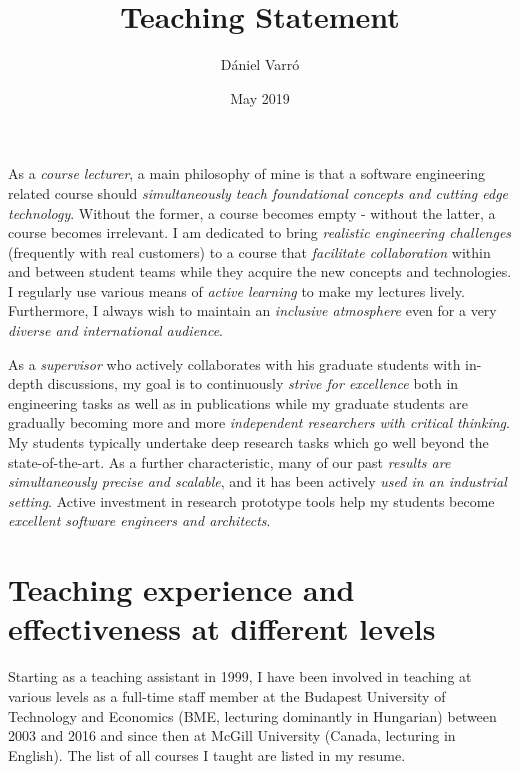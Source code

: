 \documentclass[a4paper,11pt]{article}
\title{Teaching Statement}
\author{D\'aniel Varr\'o}
\date{May 2019}
\begin{document}
\maketitle
\setcounter{page}{17}

\vspace{12pt}

\begin{tcolorbox}[title=Teaching Philosophy]
As a \emph{course lecturer}, a main philosophy of mine is that a software engineering related course should \emph{simultaneously teach foundational concepts and cutting edge technology}. Without the former, a course becomes empty - without the latter, a course becomes irrelevant. I am dedicated to bring \emph{realistic engineering challenges} (frequently with real customers) to a course that \emph{facilitate collaboration} within and between student teams while they acquire the new concepts and technologies. I regularly use various  means of \emph{active learning} to make my lectures lively. Furthermore, I always wish to maintain an \emph{inclusive atmosphere} even for a very \emph{diverse and international audience}. 
\vspace{3pt}

As a \emph{supervisor} who actively collaborates with his graduate students with in-depth discussions, my goal is to continuously \emph{strive for excellence} both in engineering tasks as well as in publications while my graduate students are gradually becoming more and more \emph{independent researchers with critical thinking}.  My students typically undertake deep research tasks which go well beyond the state-of-the-art. As a further characteristic, many of our past \emph{results are simultaneously precise and scalable}, and it has been actively \emph{used in an industrial setting}. Active investment in research prototype tools help my students become \emph{excellent software engineers and architects}.
\end{tcolorbox}


\section{Teaching experience and effectiveness at different levels}
Starting as a teaching assistant in 1999, I have been involved in teaching at various levels as a full-time staff member at the Budapest University of Technology and Economics (BME, lecturing dominantly in Hungarian) between 2003 and 2016 and since then at McGill University (Canada, lecturing in English). The list of all courses I taught are listed in my resume.
\end{document}
